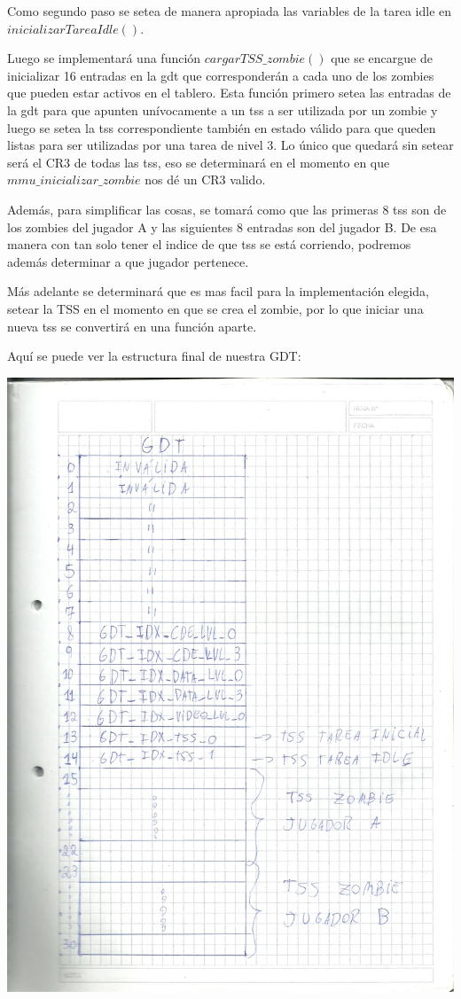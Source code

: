 \documentclass[a4paper]{article}
\begin{document}
Como segundo paso se setea de manera apropiada las variables de la tarea idle en $inicializarTareaIdle()$.

Luego se implementará una función $cargarTSS\_ zombie()$ que se encargue de inicializar 16 entradas en la gdt que corresponderán a cada uno de los zombies que pueden estar activos en el tablero. Esta función primero setea las entradas de la gdt para que apunten unívocamente a un tss a ser utilizada por un zombie y luego se setea la tss correspondiente también en estado válido para que queden listas para ser utilizadas por una tarea de nivel 3. Lo único que quedará sin setear será el CR3 de todas las tss, eso se determinará en el momento en que $mmu\_ inicializar\_ zombie$ nos dé un CR3 valido.

Además, para simplificar las cosas, se tomará como que las primeras 8 tss son de los zombies del jugador A y las siguientes 8 entradas son del jugador B. De esa manera con tan solo tener el indice de que tss se está corriendo, podremos además determinar a que jugador pertenece.

Más adelante se determinará que es mas facil para la implementación elegida, setear la TSS en el momento en que se crea el zombie, por lo que iniciar una nueva tss se convertirá en una función aparte.

Aquí se puede ver la estructura final de nuestra GDT:

\includegraphics[scale=0.29]{dibujos/dibujo4.jpg}\\
\end{document}
